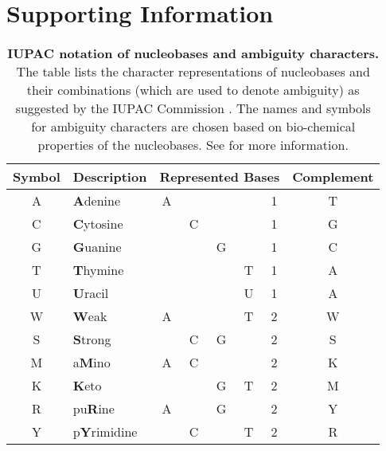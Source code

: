 
\chapter{Supporting Information}
\label{ch:SupportingInformation}

\begin{table}[htbp]
\caption[IUPAC notation of nucleobases and ambiguity characters]{
\textbf{IUPAC notation of nucleobases and ambiguity characters.}
The table lists the character representations of nucleobases and their combinations
(which are used to denote ambiguity) as suggested by the IUPAC Commission \cite{IUPAC1970}.
The names and symbols for ambiguity characters are chosen based on bio-chemical properties of the nucleobases.
See  for more information.
}
\label{tab:AmbiguityCharacters}
{
    \newcommand{\mc}[3]{\multicolumn{#1}{#2}{#3}}
    \newcommand{\rb}{\cellcolor{black!12}}
    \begin{center}
    \begin{tabular}{c|l|cccc|c|c}
    Symbol & Description & \mc{5}{c|}{Represented Bases} & Complement \\
    \hline
    A & \textbf{A}denine & \rb{} A &  &  &  & 1 & T \\
    C & \textbf{C}ytosine &  & \rb{} C &  &  & 1 & G \\
    G & \textbf{G}uanine &  &  & \rb{} G &  & 1 & C \\
    T & \textbf{T}hymine &  &  &  & \rb{} T & 1 & A \\
    U & \textbf{U}racil &  &  &  & \rb{} U & 1 & A \\
    \hline
    W & \textbf{W}eak & \rb{} A &  &  & \rb{} T & 2 & W \\
    S & \textbf{S}trong &  & \rb{} C & \rb{} G &  & 2 & S \\
    M & a\textbf{M}ino & \rb{} A & \rb{} C &  &  & 2 & K \\
    K & \textbf{K}eto &  &  & \rb{} G & \rb{} T & 2 & M \\
    R & pu\textbf{R}ine & \rb{} A &  & \rb{} G &  & 2 & Y \\
    Y & p\textbf{Y}rimidine &  & \rb{} C &  & \rb{} T & 2 & R \\

\end{tabular}
\end{center}}
\end{table}

